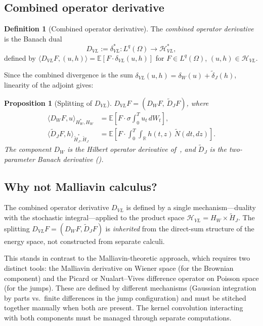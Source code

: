 \documentclass[11pt,a4paper]{article}
\theoremstyle{plain}
\newtheorem{proposition}[theorem]{Proposition}
\theoremstyle{definition}
\newtheorem{definition}[theorem]{Definition}
\theoremstyle{remark}
\newcommand{\E}{\mathbb{E}}
\newcommand{\R}{\mathbb{R}}
\newcommand{\HH}{\mathcal{H}}
\newcommand{\Ntilde}{\widetilde{N}}
\newcommand{\ip}[2]{\langle #1, #2 \rangle}
\begin{document}
\subsection{Combined operator derivative}

\begin{definition}[Combined operator derivative]\label{def:D-VL}
The \emph{combined operator derivative} is the Banach dual
\begin{equation}\label{eq:D-VL}
  D_{VL} := \delta_{VL}^* : L^q(\Omega) \to \HH_{VL}^*,
\end{equation}
defined by
$\ip{D_{VL} F}{(u,h)} = \E[F \cdot \delta_{VL}(u,h)]$
for $F \in L^q(\Omega)$, $(u,h) \in \HH_{VL}$.
\end{definition}

Since the combined divergence is the sum
$\delta_{VL}(u,h) = \delta_W(u) + \widetilde{\delta}_J(h)$,
linearity of the adjoint gives:

\begin{proposition}[Splitting of $D_{VL}$]\label{prop:D-split}
$D_{VL} F = (D_W F,\, \widetilde{D}_J F)$, where
\begin{align}
  \ip{D_W F}{u}_{H_W^*, H_W}
  &= \E\!\left[F \cdot \sigma\!\int_0^T u_t\,dW_t\right],
  \label{eq:DW}\\
  \ip{\widetilde{D}_J F}{h}_{\widetilde{H}_J^*, \widetilde{H}_J}
  &= \E\!\left[F \cdot \int_0^T\!\!\int_\R
  h(t,z)\,\Ntilde(dt,dz)\right].
  \label{eq:DJ}
\end{align}
The component $D_W$ is the Hilbert operator derivative
of~\cite{Fontes2026a}, and $\widetilde{D}_J$ is the
two-parameter Banach derivative ().
\end{proposition}



\subsection{Why not Malliavin calculus?}\label{sec:why-not-malliavin}

The combined operator derivative $D_{VL}$ is defined by a single
mechanism---duality with the stochastic integral---applied to the
product space $\mathcal{H}_{VL} = H_W \times \widetilde{H}_J$.
The splitting $D_{VL} F = (D_W F, \widetilde{D}_J F)$ is
\emph{inherited} from the direct-sum structure of the energy
space, not constructed from separate calculi.

This stands in contrast to the Malliavin-theoretic approach,
which requires two distinct tools: the Malliavin derivative on
Wiener space (for the Brownian component) and the Picard or
Nualart--Vives difference operator on Poisson space (for the
jumps).  These are defined by different mechanisms (Gaussian
integration by parts vs.\ finite differences in the jump
configuration) and must be stitched together manually when both
are present.  The kernel convolution interacting with both
components must be managed through separate computations.
\end{document}
